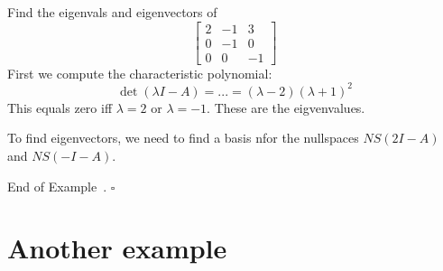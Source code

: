\documentclass[10pt]{article}
\theoremstyle{definition}
\newtheorem{example}[theorem]{Example}
\renewenvironment{example}
{\begin{oldexample}}
  {\par\smallskip\hfill   End of Example~\theexample. $\square$    \par\end{oldexample}}
\begin{document}
\begin{example}
  Find the eigenvals and eigenvectors of
  \begin{equation*}
    \begin{bmatrix}
      2&-1&3\\
      0&-1&0\\
      0&0&-1
    \end{bmatrix}
  \end{equation*}
  First we compute the characteristic polynomial:
  \begin{equation*}
    \det(\lambda I-A) = ... = (\lambda-2)(\lambda+1)^{2}
  \end{equation*}
  This equals zero iff $\lambda=2$ or $\lambda=-1$. These are the
  eigvenvalues.

  To find eigenvectors, we need to find a basis nfor the nullspaces $NS(2I-A)$
  and $NS(-I-A)$.
\end{example}


\newpage
\section{Another example}
\end{document}
